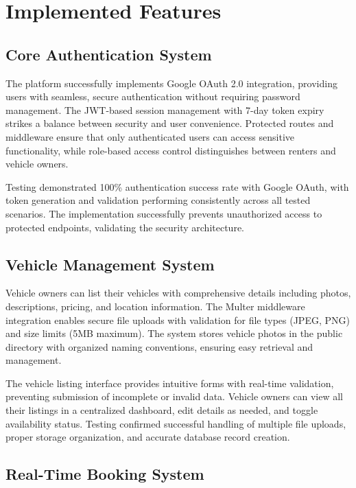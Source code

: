 \documentclass[12pt,a4paper]{report}
\begin{document}
	\section{Implemented Features}
	
	\subsection{Core Authentication System}
	
	The platform successfully implements Google OAuth 2.0 integration, providing users with seamless, secure authentication without requiring password management. The JWT-based session management with 7-day token expiry strikes a balance between security and user convenience. Protected routes and middleware ensure that only authenticated users can access sensitive functionality, while role-based access control distinguishes between renters and vehicle owners.
	
	Testing demonstrated 100\% authentication success rate with Google OAuth, with token generation and validation performing consistently across all tested scenarios. The implementation successfully prevents unauthorized access to protected endpoints, validating the security architecture.
	
	\subsection{Vehicle Management System}
	
	Vehicle owners can list their vehicles with comprehensive details including photos, descriptions, pricing, and location information. The Multer middleware integration enables secure file uploads with validation for file types (JPEG, PNG) and size limits (5MB maximum). The system stores vehicle photos in the public directory with organized naming conventions, ensuring easy retrieval and management.
	
	The vehicle listing interface provides intuitive forms with real-time validation, preventing submission of incomplete or invalid data. Vehicle owners can view all their listings in a centralized dashboard, edit details as needed, and toggle availability status. Testing confirmed successful handling of multiple file uploads, proper storage organization, and accurate database record creation.
	
	\subsection{Real-Time Booking System}
	
\end{document}
